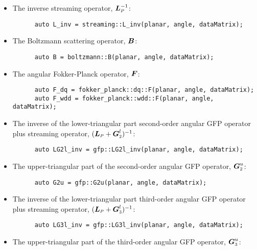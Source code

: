 \documentclass[../main.tex]{subfiles}
\begin{document}
\begin{itemize}
    \item The inverse streaming operator, $\Lp^{-1}$:
    \begin{verbatim}
      auto L_inv = streaming::L_inv(planar, angle, dataMatrix);
    \end{verbatim}
    \item The Boltzmann scattering operator, $\boldsymbol{B}$:
    \begin{verbatim}
      auto B = boltzmann::B(planar, angle, dataMatrix);
    \end{verbatim}
    \item The angular Fokker-Planck operator, $\boldsymbol{F}$:
    \begin{verbatim}
      auto F_dq = fokker_planck::dq::F(planar, angle, dataMatrix);
      auto F_wdd = fokker_planck::wdd::F(planar, angle, dataMatrix);
    \end{verbatim}
    \item The inverse of the lower-triangular part second-order angular GFP operator plus streaming operator, $(\Lp+\Gtwo^l)^{-1}$:
    \begin{verbatim}
      auto LG2l_inv = gfp::LG2l_inv(planar, angle, dataMatrix);
    \end{verbatim}
    \item The upper-triangular part of the second-order angular GFP operator, $\Gtwo^u$:
    \begin{verbatim}
      auto G2u = gfp::G2u(planar, angle, dataMatrix);
    \end{verbatim}
    \item The inverse of the lower-triangular part third-order angular GFP operator plus streaming operator, $(\Lp+\Gthree^l)^{-1}$:
    \begin{verbatim}
      auto LG3l_inv = gfp::LG3l_inv(planar, angle, dataMatrix);
    \end{verbatim}
    \item The upper-triangular part of the third-order angular GFP operator, $\Gthree^u$:

\end{itemize}
\end{document}
